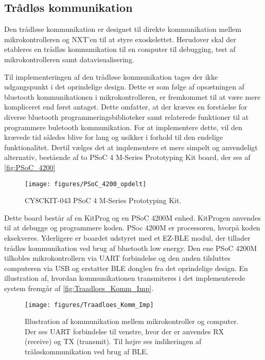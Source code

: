 \subsection{Trådløs kommunikation}
Den trådløse kommunikation er designet til direkte kommunikation mellem mikrokontrolleren og NXT'en til at styre exoskelettet. Herudover skal der etableres en trådløs kommunikation til en computer til debugging, test af mikrokontrolleren samt datavisualisering.   

\noindent
Til implementeringen af den trådløse kommunikation tages der ikke udgangspunkt i det oprindelige design. Dette er som følge af opsætningen af bluetooth kommunikationen i mikrokontrolleren, er fremkommet til at være mere kompliceret end først antaget. Dette omfatter, at der kræves en forståelse for diverse bluetooth programmeringsbiblioteker samt relaterede funktioner til at programmere buletooth kommunikation. For at implementere dette, vil den krævede tid således blive for lang og usikker i forhold til den endelige funktionalitet.
Dertil vælges det at implementere et mere simpelt og anvendeligt alternativ, bestående af to PSoC 4 M-Series Prototyping Kit board, der ses af \autoref{fig:PSoC_4200}

\begin{figure}[H]
	\centering
	\texttt{[image: figures/PSoC\_4200\_opdelt]}
	\caption{CY8CKIT-043 PSoC 4 M-Series Prototyping Kit\citep{cypress42015}.}
	\label{fig:PSoC_4200}
\end{figure}

\noindent
Dette board består af en KitProg og en PSoC 4200M enhed. KitProgen anvendes til at debugge og programmere koden. PSoc 4200M er processoren, hvorpå koden eksekveres. Yderligere er boardet udstyret med et EZ-BLE modul, der tillader trådløs kommunikation ved brug af bluetooth low energy. 
Den ene PSoC 4200M tilkobles mikrokontrollern via UART forbindelse og den anden tilsluttes computeren via USB og erstatter BLE donglen fra det oprindelige design. En illustration af, hvordan kommunikationen transmiteres i det implementerede system fremgår af \autoref{fig:Traadloes_Komm_Imp}.

\begin{figure}[H]
	\centering
	\texttt{[image: figures/Traadloes\_Komm\_Imp]}
	\caption{Illustration af kommunikation mellem mikrokontroller og computer. Der ses UART forbindelse til venstre, hvor der er anvendes RX (receive) og TX (transmit). Til højre ses indikeringen af tråløskommunikation ved brug af BLE.} 
	\label{fig:Traadloes_Komm_Imp}
\end{figure}

